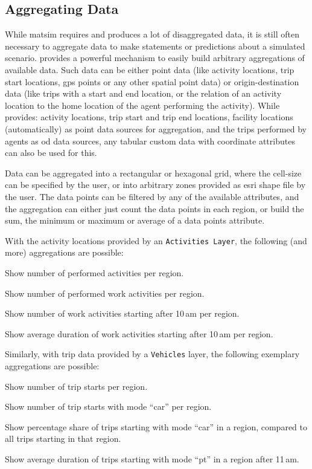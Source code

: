 \subsection{Aggregating Data}
While \gls{matsim} requires and produces a lot of disaggregated data, it 
is still often necessary to aggregate data to make statements or predictions about a
simulated scenario. \Via{} provides a powerful mechanism to easily build
arbitrary aggregations of available data. Such data can be either point data
(like activity locations, trip start locations, \gls{gps} points or any other spatial
point data) or origin-destination data (like trips with a start and end
location, or the relation of an activity location to the home location of the
agent performing the activity). While \Via{} provides: activity locations, trip
start and trip end locations, facility locations (automatically) as point data
sources for aggregation, and the trips performed by agents as \gls{od} data sources,
any tabular custom data with coordinate attributes can also be used for this. 

Data can be aggregated into a rectangular or hexagonal grid, where the cell-size
can be specified by the user, or into arbitrary zones provided as \gls{esri} shape file by the user. The data points can be filtered by any of the
available attributes, and the aggregation can either just count the data points
in each region, or build the sum, the minimum or maximum or average of a data points
attribute.

With the activity locations provided by an
\lstinline|Activities Layer|, the following (and more) aggregations are possible:
\begin{compactitem}
  \item Show number of performed activities per region.
  \item Show number of performed work activities per region.
  \item Show number of work activities starting after 10\,am per region.
  \item Show average duration of work activities starting after 10\,am per
  region.
\end{compactitem}
Similarly, with  trip data provided by a \lstinline|Vehicles| layer, the following
exemplary aggregations are possible:
\begin{compactitem}
  \item Show number of trip starts per region.
  \item Show number of trip starts with mode ``car'' per region.
  \item Show percentage share of trips starting with mode ``car'' in a
  region, compared to all trips starting in that region.
  \item Show average duration of trips starting with mode ``pt'' in a region
  after 11\,am.
\end{compactitem}

